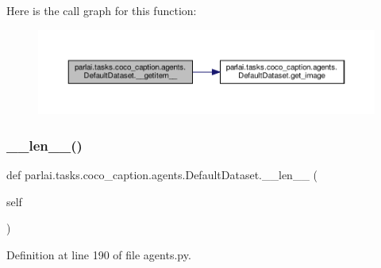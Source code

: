 Here is the call graph for this function\+:
\nopagebreak
\begin{figure}[H]
\begin{center}
\leavevmode
\includegraphics[width=350pt]{classparlai_1_1tasks_1_1coco__caption_1_1agents_1_1DefaultDataset_ab8de4a6469a2952710a6921ce19a88f6_cgraph}
\end{center}
\end{figure}
\mbox{\label{classparlai_1_1tasks_1_1coco__caption_1_1agents_1_1DefaultDataset_a23416fba34b1d20a547b7beef3efd220}} 
\subsubsection{\texorpdfstring{\+\_\+\+\_\+len\+\_\+\+\_\+()}{\_\_len\_\_()}}
{\footnotesize\ttfamily def parlai.\+tasks.\+coco\+\_\+caption.\+agents.\+Default\+Dataset.\+\_\+\+\_\+len\+\_\+\+\_\+ (\begin{DoxyParamCaption}\item[{}]{self }\end{DoxyParamCaption})}



Definition at line 190 of file agents.\+py.



